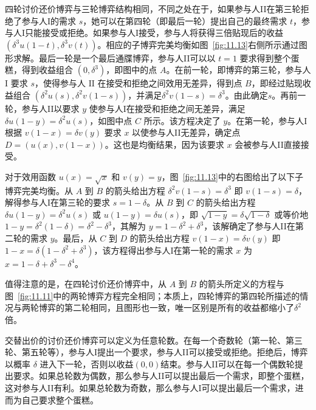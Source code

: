 四轮讨价还价博弈与三轮博弈结构相同，不同之处在于，如果参与人II在第三轮拒绝了参与人I的需求 \(s\)，她可以在第四轮（即最后一轮）提出自己的最终需求 \(t\)，参与人I只能接受或拒绝。如果参与人I接受，参与人将获得三倍贴现后的收益 \(\left( {{\delta }^{3}u\left( {1 - t}\right),{\delta }^{3}v\left( t\right) }\right)\)。相应的子博弈完美均衡如图~\ref{fig:11.13}右侧所示通过图形求解。最后一轮是一个最后通牒博弈，参与人II可以以 \(t = 1\) 要求得到整个蛋糕，得到收益组合 \(\left( {0,{\delta }^{3}}\right)\)，即图中的点 \(A\)。在前一轮，即博弈的第三轮，参与人 \(\mathrm{I}\) 要求 \(s\)，使得参与人 \(\mathrm{{II}}\) 在接受和拒绝之间效用无差异，得到点 \(B\)，即经过贴现收益组合 \(\left( {{\delta }^{2}u\left( s\right),{\delta }^{2}v\left( {1 - s}\right) }\right)\)，并满足\({\delta }^{2}v\left( {1 - s}\right)  = {\delta }^{3}\)。由此确定\(s\)。再前一轮，参与人II以要求 \(y\) 使参与人I在接受和拒绝之间无差异，满足 \({\delta u}\left( {1 - y}\right)  = {\delta }^{2}u\left( s\right)\)，如图中点 \(C\) 所示。该方程决定了 \(y\)。在第一轮，参与人I根据 \(v\left( {1 - x}\right)  = {\delta v}\left( y\right)\) 要求 \(x\) 以使参与人II无差异，确定点 \(D = \left( {u\left( x\right),v\left( {1 - x}\right) }\right)\)。这也是均衡结果，因为该要求 \(x\) 会被参与人II直接接受。


对于效用函数 \(u\left( x\right)  = \sqrt{x}\) 和 \(v\left( y\right)  = y\)，图~\ref{fig:11.13}中的右图给出了以下子博弈完美均衡。从 \(A\) 到 \(B\) 的箭头给出方程 \({\delta }^{2}v\left( {1 - s}\right)  = {\delta }^{3}\) 即 \(v\left( {1 - s}\right)  = \delta\)，解得参与人I在第三轮的要求 \(s = 1 - \delta\)。从 \(B\) 到 \(C\) 的箭头给出方程 \({\delta u}\left( {1 - y}\right)  = {\delta }^{2}u\left( s\right)\) 或 \(u\left( {1 - y}\right)  = {\delta u}\left( s\right)\)，即 \(\sqrt{1 - y} = \delta \sqrt{1 - \delta }\) 或等价地 \(1 - y = {\delta }^{2}\left( {1 - \delta }\right)  = {\delta }^{2} - {\delta }^{3}\)，其解为 \(y = 1 - {\delta }^{2} + {\delta }^{3}\)，该解确定了参与人II在第二轮的需求 \(y\)。最后，从 \(C\) 到 \(D\) 的箭头给出方程 \(v\left( {1 - x}\right)  = {\delta v}\left( y\right)\) 即 \(1 - x = \delta \left( {1 - {\delta }^{2} + {\delta }^{3}}\right)\)，该方程得出参与人I在第一轮的需求 \(x\) 为 \(x = 1 - \delta  + {\delta }^{3} - {\delta }^{4}\)。

值得注意的是，在四轮讨价还价博弈中，从 \(A\) 到 \(B\) 的箭头所定义的方程与图~\ref{fig:11.11}中的两轮博弈方程完全相同；本质上，四轮博弈的第四轮所描述的情况与两轮博弈的第二轮相同，且图形也一致，唯一区别是所有的收益都缩小了\({\delta }^{2}\)倍。

交替出价的讨价还价博弈可以定义为任意轮数。在每一个奇数轮（第一轮、第三轮、第五轮等），参与人I提出一个要求，参与人II可以接受或拒绝。拒绝后，博弈以概率 \(\delta\) 进入下一轮，否则以收益$(0,0)$结束。参与人II可以在每一个偶数轮提出要求。如果总轮数为偶数，那么参与人II可以提出最后一个需求，即整个蛋糕，这对参与人II有利。如果总轮数为奇数，那么参与人I可以提出最后一个需求，进而为自己要求整个蛋糕。

